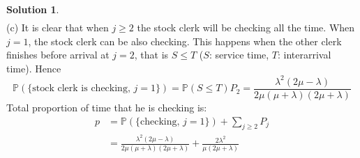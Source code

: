 \documentclass[a4paper, 10pt]{article}
\theoremstyle{definition}
\theoremstyle{hSol}
\newtheorem*{solution}{Solution}
\begin{document}
\begin{solution}
\begin{equation}
\begin{split}
  \end{split}
\end{equation}
(c) It is clear that when $j\geq 2$ the stock clerk will be checking all the time. When $j=1$, the stock clerk can be also checking. This happens when the other clerk finishes before arrival at $j=2$, that is $S\leq T$ ($S$: service time, $T$: interarrival time). Hence
\begin{equation}
  \mathbb{P}\left(\{\text{stock clerk is checking, }j=1\}\right) = \mathbb{P}\left(S \leq T\right) P_2 = \frac{\lambda^2(2\mu - \lambda)}{2\mu(\mu+\lambda)(2\mu + \lambda)}
\end{equation}
Total proportion of time that he is checking is:
\begin{equation}
  \begin{split}
    p &= \mathbb{P}\left(\{\text{checking, }j=1\}\right) + \sum_{j\geq 2} P_j\\
    &= \frac{\lambda^2(2\mu - \lambda)}{2\mu(\mu+\lambda)(2\mu + \lambda)} + \frac{2 \lambda^2}{\mu(2\mu+\lambda)}
  \end{split}
\end{equation}
\end{solution}
\end{document}
